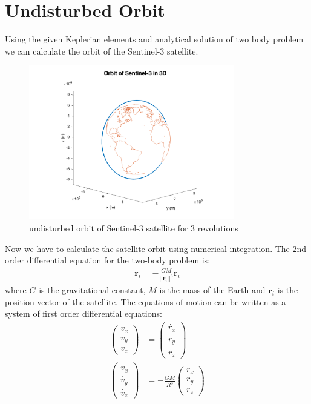 \documentclass[12pt
,headinclude
,headsepline
,bibtotocnumbered
]{scrartcl}
\begin{document}
\section*{Undisturbed Orbit}
Using the given Keplerian elements and analytical solution of two body problem we can calculate the orbit of the Sentinel-3 satellite. 
\begin{figure}[H]
\centering
\includegraphics[width=0.8\textwidth]{./plots/3D_orbit.png}
\caption{undisturbed orbit of Sentinel-3 satellite for 3 revolutions}
\end{figure}
Now we have to calculate the satellite orbit using numerical integration. The 2nd order differential equation for the two-body problem is:
\begin{align*}
	\ddot{\textbf{r}}_i=-\frac{GM}{\left|\left|\textbf{r}_i\right|\right|^3}\textbf{r}_i
\end{align*}
where $G$ is the gravitational constant, $M$ is the mass of the Earth and $\textbf{r}_i$ is the position vector of the satellite. The equations of motion can be written as a system of first order differential equations:
\begin{align*}
	\begin{pmatrix}
	v_x\\v_y\\v_z
	\end{pmatrix}&=\begin{pmatrix}
	\dot{r_x}\\\dot{r_y}\\\dot{r_z}
	\end{pmatrix}\\
	\begin{pmatrix}
	\dot{v_x}\\\dot{v_y}\\\dot{v_z}
	\end{pmatrix}&=-\frac{GM}{R^3}\begin{pmatrix}
	r_x\\r_y\\r_z
	\end{pmatrix}
\end{align*}
\end{document}
